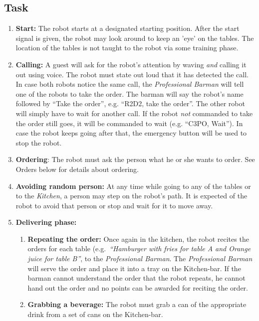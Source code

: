 \subsection{Task}
\begin{enumerate}
	\item \textbf{Start:} The robot starts at a designated starting position. After the start signal is given, the robot may look around to keep an 'eye' on the tables.
	  The location of the tables is not taught to the robot via some training phase. 
	
	\item \textbf{Calling:} A guest will ask for the robot's attention by waving \emph{and} calling it out using voice. 
	  The robot must state out loud that it has detected the call. 
	  In case both robots notice the same call, the \textit{Professional Barman} will tell one of the robots to take the order. 
	  The barman will say the robot's name followed by ``Take the order'', e.g. ``R2D2, take the order''. 
	  The other robot will simply have to wait for another call. 
	  If the robot \textit{not} commanded to take the order still goes, it will be commanded to wait (e.g. ``C3PO, Wait''). 
	  In case the robot keeps going after that, the emergency button will be used to stop the robot. 
	
	\item \textbf{Ordering}: The robot must ask the person what he or she wants to order. See Orders below for details about ordering.
	\item \textbf{Avoiding random person:} At any time while going to any of the tables or to the \textit{Kitchen}, a person may step on the robot's path. 
	  It is expected of the robot to avoid that person or stop and wait for it to move away.

	\item \textbf{Delivering phase:}
	\begin{enumerate}
		\item \textbf{Repeating the order:} Once again in the kitchen, the robot recites the orders for each table (e.g.~\textit{``Hamburger with fries for table A and Orange juice for table B''}, to the \textit{Professional Barman}. 
		  The \textit{Professional Barman} will serve the order and place it into a tray on the Kitchen-bar.
		  If the barman cannot understand the order that the robot repeats, he cannot hand out the order and no points can be awarded for reciting the order.

		\item \textbf{Grabbing a beverage:} The robot must grab a can of the appropriate drink from a set of cans on the Kitchen-bar. 


\end{enumerate}
\end{enumerate}
